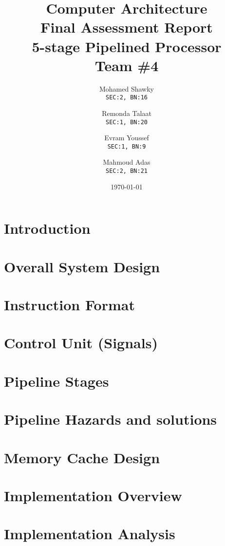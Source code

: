 \documentclass[12pt]{report}
\title{\textbf{Computer Architecture} \\
\textbf{Final Assessment Report} \\
5-stage Pipelined Processor \\
Team \#4}
\author{
  Mohamed Shawky\\
  \small\texttt{SEC:2, BN:16}
  \and
  Remonda Talaat\\
  \small\texttt{SEC:1, BN:20}
  \and
  Evram Youssef\\
  \small\texttt{SEC:1, BN:9}
  \and
  Mahmoud Adas\\
  \small\texttt{SEC:2, BN:21}
}
\date{\today}
\begin{document}
\thispagestyle{empty}

\maketitle
\tableofcontents
\listoffigures
\listoftables
\clearpage


\part{Introduction}


\part{Overall System Design}


\part{Instruction Format}


\part{Control Unit (Signals)}


\part{Pipeline Stages}


\part{Pipeline Hazards and solutions}


\part{Memory Cache Design}


\part{Implementation Overview}


\part{Implementation Analysis}

\end{document}
